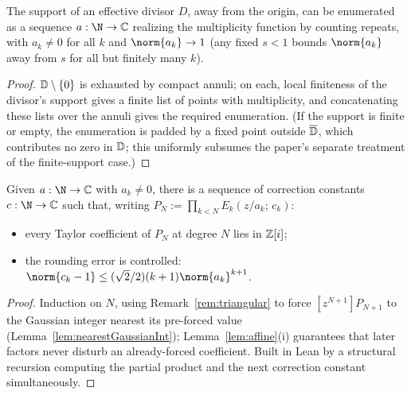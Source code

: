 \begin{lemma}
  \label{lem:enum}
  \leanok
  The support of an effective divisor $D$, away from the origin, can be
  enumerated as a sequence $a : \N \to \C$ realizing the multiplicity
  function by counting repeats, with $a_k \ne 0$ for all $k$ and
  $\norm{a_k} \to 1$ (any fixed $s<1$ bounds $\norm{a_k}$ away from $s$
  for all but finitely many $k$).
\end{lemma}
\begin{proof}
  \leanok
  $\mathbb{D} \setminus \{0\}$ is exhausted by compact annuli; on each, local
  finiteness of the divisor's support gives a finite list of points with
  multiplicity, and concatenating these lists over the annuli gives the
  required enumeration. (If the support is finite or empty, the
  enumeration is padded by a fixed point outside $\overline{\mathbb{D}}$, which
  contributes no zero in $\mathbb{D}$; this uniformly subsumes the paper's
  separate treatment of the finite-support case.)
\end{proof}

\begin{lemma}
  \label{lem:coeffSeq}
  \leanok
  Given $a : \N \to \C$ with $a_k \ne 0$, there is a sequence of
  correction constants $c : \N \to \C$ such that, writing $P_N :=
  \prod_{k<N} E_k(z/a_k;\,c_k)$:
  \begin{itemize}
    \item every Taylor coefficient of $P_N$ at degree $N$ lies in $\mathbb{Z}[i]$;
    \item the rounding error is controlled:
      $\norm{c_k - 1} \le (\sqrt2/2)(k+1)\norm{a_k}^{k+1}$.
  \end{itemize}
\end{lemma}
\begin{proof}
  \leanok
  Induction on $N$, using Remark~\ref{rem:triangular} to force
  $[z^{N+1}]P_{N+1}$ to the Gaussian integer nearest its pre-forced
  value (Lemma~\ref{lem:nearestGaussianInt}); Lemma~\ref{lem:affine}(i)
  guarantees that later factors never disturb an already-forced
  coefficient. Built in Lean by a structural recursion computing the
  partial product and the next correction constant simultaneously.
\end{proof}

